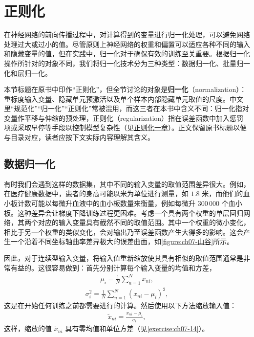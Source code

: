\documentclass[../../main.tex]{subfiles}
\begin{document}
\section{正则化}\label{section:ch07-正则化}

在神经网络的前向传播过程中，对计算得到的变量进行归一化处理，可以避免网络处理过大或过小的值。尽管原则上神经网络的权重和偏置可以适应各种不同的输入和隐藏变量的值，但在实践中，归一化对于确保有效的训练至关重要。根据归一化操作所针对的对象不同，我们将归一化技术分为三种类型：数据归一化、批量归一化和层归一化。

\begin{remark}
本节标题在原书中印作“正则化”，但全节讨论的对象是\textbf{归一化}（normalization）：重标度输入变量、隐藏单元预激活以及单个样本内部隐藏单元取值的尺度。中文里“规范化”“归一化”“正则化”常被混用，而这三者在本书中含义不同：归一化指对变量作平移与伸缩的预处理，正则化（regularization）指在误差函数中加入惩罚项或采取早停等手段以控制模型复杂性（见\hyperref[chapter:ch09-正则化]{正则化一章}）。正文保留原书标题以便与目录对应，读者应按下文实际内容理解其含义。
\end{remark}

\subsection{数据归一化}\label{subsection:ch07-数据归一化}

有时我们会遇到这样的数据集，其中不同的输入变量的取值范围差异很大。例如，在医疗健康数据中，患者的身高可能以米为单位进行测量，如 $1.8$ 米，而他们的血小板计数可能以每微升血液中的血小板数量来衡量，例如每微升 $300\,000$ 个血小板。这种差异会让梯度下降训练过程更困难。考虑一个具有两个权重的单层回归网络，其两个对应的输入变量具有截然不同的取值范围。其中一个权重的微小变化，相比于另一个权重的类似变化，会对输出乃至误差函数产生大得多的影响。这会产生一个沿着不同坐标轴曲率差异极大的误差曲面，如\cref{figure:ch07-山谷}所示。

因此，对于连续型输入变量，将输入值重新缩放使其具有相似的取值范围通常是非常有益的。这很容易做到：首先分别计算每个输入变量的均值和方差，
\begin{align}
\mu_i = \frac{1}{N}\sum_{n=1}^{N}x_{ni},
\label{align:ch07-输入均值}
\end{align}
\begin{align}
\sigma_i^{2} = \frac{1}{N}\sum_{n=1}^{N}(x_{ni}-\mu_i)^{2},
\label{align:ch07-输入方差}
\end{align}
这是在开始任何训练之前都需要进行的计算。然后使用以下方法缩放输入值：
\begin{align}
\tilde{x}_{ni} = \frac{x_{ni}-\mu_i}{\sigma_i},
\label{align:ch07-输入标准化}
\end{align}
这样，缩放的值 $\tilde{x}_{ni}$ 具有零均值和单位方差（见\cref{exercise:ch07-14}）。
\end{document}
